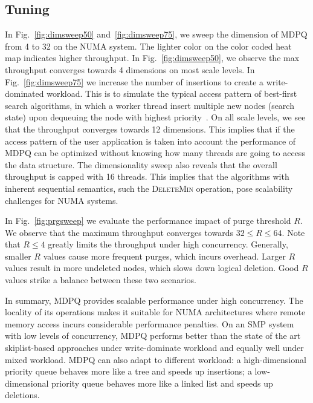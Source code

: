 \documentclass[10pt,journal,letter,compsoc]{IEEEtran}
\begin{document}
\subsection{Tuning}
In Fig.~\ref{fig:dimsweep50} and~\ref{fig:dimsweep75}, we sweep the dimension of MDPQ from 4 to 32 on the NUMA system.
The lighter color on the color coded heat map indicates higher throughput.
In Fig.~\ref{fig:dimsweep50}, we observe the max throughput converges towards 4 dimensions on most scale levels.
In Fig.~\ref{fig:dimsweep75} we increase the number of insertions to create a write-dominated workload.
This is to simulate the typical access pattern of best-first search algorithms, in which a worker thread insert multiple new nodes (search state) upon dequeuing the node with highest priority~\cite{burns2010best}.
On all scale levels, we see that the throughput converges towards 12 dimensions.
This implies that if the access pattern of the user application is taken into account the performance of MDPQ can be optimized  without knowing how many threads are going to access the data structure.
The dimensionality sweep also reveals that the overall throughput is capped with 16 threads.
This implies that the algorithms with inherent sequential semantics, such the \textsc{DeleteMin} operation, pose scalability challenges for NUMA systems.

In Fig.~\ref{fig:prgsweep} we evaluate the performance impact of purge threshold $R$.
We observe that the maximum throughput converges towards $32 \le R \le 64$.
Note that $R \le 4$ greatly limits the throughput under high concurrency.
Generally, smaller $R$ values cause more frequent purges, which incurs overhead. 
Larger $R$ values result in more undeleted nodes, which slows down logical deletion. 
Good $R$ values strike a balance between these two scenarios.

In summary, MDPQ provides scalable performance under high concurrency.
The locality of its operations makes it suitable for NUMA architectures where remote memory access incurs considerable performance penalties.
On an SMP system with low levels of concurrency, MDPQ performs better than the state of the art skiplist-based approaches under write-dominate workload and equally well under mixed workload.
MDPQ can also adapt to different workload: a high-dimensional priority queue behaves more like a tree and speeds up insertions; a low-dimensional priority queue behaves more like a linked list and speeds up deletions.

\vspace{-0.1in}
\end{document}
